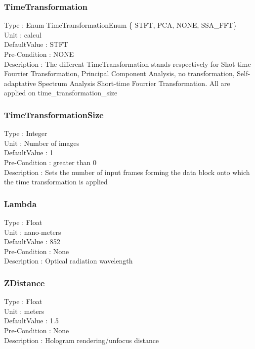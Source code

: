 \subsubsection{TimeTransformation}
\noindent
Type : Enum TimeTransformationEnum \{ STFT, PCA, NONE, SSA\_FFT\}\\
Unit : calcul\\
DefaultValue : STFT\\
Pre-Condition : NONE\\
Description : The different TimeTransformation stands respectively for Shot-time Fourrier Transformation, Principal Component Analysis, no transformation, Self-adaptative Spectrum Analysis Short-time Fourrier Transformation. All are applied on time\_transformation\_size\\

\subsubsection{TimeTransformationSize}
\noindent
Type : Integer\\
Unit : Number of images\\
DefaultValue : 1\\
Pre-Condition : greater than 0\\
Description : Sets the number of input frames forming the data block onto which the time transformation is applied\\

\subsubsection{Lambda}
\noindent
Type : Float\\
Unit : nano-meters\\
DefaultValue : 852\\
Pre-Condition : None\\
Description : Optical radiation wavelength\\

\subsubsection{ZDistance}
\noindent
Type : Float\\
Unit : meters\\
DefaultValue : 1.5\\
Pre-Condition : None\\
Description : Hologram rendering/unfocus distance\\

